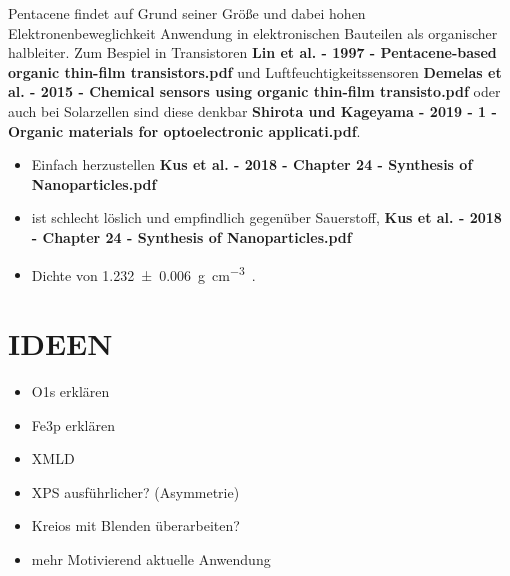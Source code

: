             Pentacene findet auf Grund seiner Größe und dabei hohen Elektronenbeweglichkeit Anwendung in elektronischen Bauteilen als organischer halbleiter.
            Zum Bespiel in Transistoren \textbf{Lin et al. - 1997 - Pentacene-based organic thin-film transistors.pdf} und Luftfeuchtigkeitssensoren \textbf{Demelas et al. - 2015 - Chemical sensors using organic thin-film transisto.pdf} oder auch bei Solarzellen sind diese denkbar \textbf{Shirota und Kageyama - 2019 - 1 - Organic materials for optoelectronic applicati.pdf}.
            
            \begin{itemize}
                \item Einfach herzustellen \textbf{Kus et al. - 2018 - Chapter 24 - Synthesis of Nanoparticles.pdf}
                \item ist schlecht löslich und empfindlich gegenüber Sauerstoff, \textbf{Kus et al. - 2018 - Chapter 24 - Synthesis of Nanoparticles.pdf}
                \item Dichte von \SI{1.232(6)}{\gram\per\cubic\centi\meter}~\cite{CAS}.
            \end{itemize}
            

            \section{IDEEN}
            \begin{itemize}
                \item O1s erklären
                \item Fe3p erklären 
                \item XMLD
                \item XPS ausführlicher? (Asymmetrie)
                \item Kreios mit Blenden überarbeiten?
                \item mehr Motivierend aktuelle Anwendung
            \end{itemize}
            